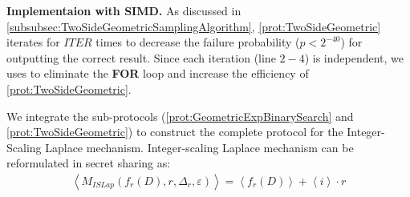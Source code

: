       \textbf{Implementaion with SIMD.}
      As discussed in \autoref{subsubsec:TwoSideGeometricSamplingAlgorithm}, \autoref{prot:TwoSideGeometric} iterates for $ITER$ times to decrease the failure probability ($p<2^{-40}$) for outputting the correct result. Since each iteration (line $2-4$) is independent, we uses \simd to eliminate the \textbf{FOR} loop and increase the efficiency of \autoref{prot:TwoSideGeometric}.


      We integrate the sub-protocols (\autoref{prot:GeometricExpBinarySearch} and \autoref{prot:TwoSideGeometric}) to construct the complete \booleanGMW protocol for the Integer-Scaling Laplace mechanism.
      Integer-scaling Laplace mechanism can be reformulated in secret sharing as:
      \begin{equation}
            \begin{split}
                  \left\langle M_{ISLap}\left(f_r\left(D\right),r,\Delta_r,\varepsilon\right)\right\rangle =\left\langle f_r\left(D\right)\right\rangle + \left\langle i\right\rangle \cdot r
            \end{split}
      \end{equation}

